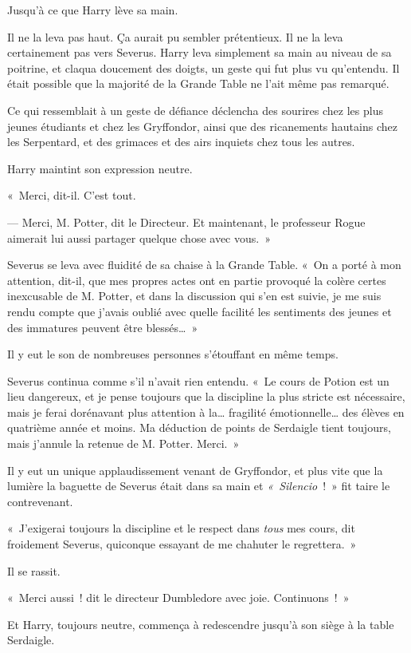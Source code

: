 Jusqu'à ce que Harry lève sa main.

Il ne la leva pas haut. Ça aurait pu sembler prétentieux. Il ne la leva certainement pas vers Severus. Harry leva simplement sa main au niveau de sa poitrine, et claqua doucement des doigts, un geste qui fut plus vu qu'entendu. Il était possible que la majorité de la Grande Table ne l'ait même pas remarqué.

Ce qui ressemblait à un geste de défiance déclencha des sourires chez les plus jeunes étudiants et chez les Gryffondor, ainsi que des ricanements hautains chez les Serpentard, et des grimaces et des airs inquiets chez tous les autres.

Harry maintint son expression neutre.

«~Merci, dit-il. C'est tout.

--- Merci, M. Potter, dit le Directeur. Et maintenant, le professeur Rogue aimerait lui aussi partager quelque chose avec vous.~»

Severus se leva avec fluidité de sa chaise à la Grande Table. «~On a porté à mon attention, dit-il, que mes propres actes ont en partie provoqué la colère certes inexcusable de M. Potter, et dans la discussion qui s'en est suivie, je me suis rendu compte que j'avais oublié avec quelle facilité les sentiments des jeunes et des immatures peuvent être blessés…~»

Il y eut le son de nombreuses personnes s'étouffant en même temps.

Severus continua comme s'il n'avait rien entendu. «~Le cours de Potion est un lieu dangereux, et je pense toujours que la discipline la plus stricte est nécessaire, mais je ferai dorénavant plus attention à la… fragilité émotionnelle… des élèves en quatrième année et moins. Ma déduction de points de Serdaigle tient toujours, mais j'annule la retenue de M. Potter. Merci.~»

Il y eut un unique applaudissement venant de Gryffondor, et plus vite que la lumière la baguette de Severus était dans sa main et \emph{«~Silencio}~!~» fit taire le contrevenant.

«~J'exigerai toujours la discipline et le respect dans \emph{tous} mes cours, dit froidement Severus, quiconque essayant de me chahuter le regrettera.~»

Il se rassit.

«~Merci aussi~! dit le directeur Dumbledore avec joie. Continuons~!~»

Et Harry, toujours neutre, commença à redescendre jusqu'à son siège à la table Serdaigle.

